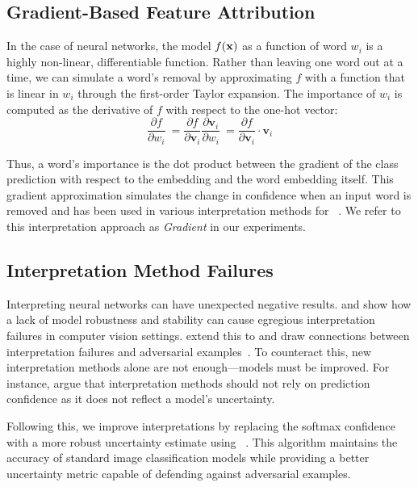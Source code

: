 \subsection{Gradient-Based Feature Attribution}
\label{sec:gradient}
In the case of neural networks, the model $f(\boldsymbol{\mathbf{x}})$ as a function of word
$w_i$ is a highly non-linear, differentiable function. Rather than leaving one word
out at a time,
we can simulate a word's removal by approximating
$f$ with a function that is linear in $w_i$ through the first-order Taylor expansion. 
The importance of $w_i$ is computed as the derivative of $f$ with respect to the one-hot vector:
\begin{equation}
    \frac{\partial f}{\partial w_i} \
    = \frac{\partial f}{\partial \bm{v}_i}\frac{\partial \bm{v}_i}{\partial w_i} \ 
    = \frac{\partial f}{\partial \bm{v}_i} \cdot \bm{v}_i 
\end{equation}

Thus, a word's importance is the dot product between the gradient of the class prediction
with respect to the embedding and the word embedding itself.
This gradient approximation simulates the change in
confidence when an input word is removed and has been used in various interpretation
methods for \abr{nlp}~\cite{arras2016explaining,
ebrahimi2017hotflip}. We refer to this interpretation approach as \textit{Gradient}
in our experiments. 

\subsection{Interpretation Method Failures}

Interpreting neural networks can have unexpected negative results. 
\citet{ghorbani2017interpretation} and \citet{kindermans2017unreliability}
show how a lack of model robustness and stability 
can cause egregious interpretation failures in computer vision settings.
\citet{feng2018rawr} extend this to \abr{nlp} and draw
connections between interpretation failures and adversarial examples~\cite{szegedy2013intriguing}.
To counteract this, new interpretation methods alone
are not enough---models must be improved. For instance, 
\citet{feng2018rawr} argue that interpretation methods should not rely
on prediction confidence as it does not reflect a model's uncertainty.

Following this, we improve interpretations by replacing
the softmax confidence with a more robust uncertainty estimate
using \dknn{}~\cite{papernot2018dknn}. This algorithm maintains
the accuracy of standard image classification models
while providing a better uncertainty metric capable of defending against adversarial examples.